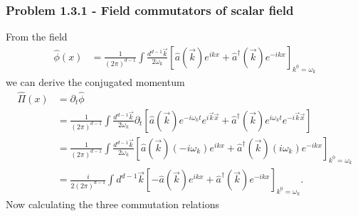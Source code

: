 \documentclass[10pt,a4paper]{book}
\theoremstyle{definition}
\begin{document}
\subsubsection{Problem 1.3.1 - Field commutators of scalar field}
From the field  
\begin{align}
    \hat\phi(x)&=\frac{1}{(2\pi)^{d-1}}\int \frac{d^{d-1}\vec{k}}{2\omega_k}\left[\hat a(\vec{k})e^{ikx} + \hat a^\dagger(\vec{k})e^{-ikx}\right]_{k^0=\omega_k}
\end{align}
we can derive the conjugated momentum
\begin{align}
    \hat\Pi(x)&=\partial_t\hat\phi\\
    &=\frac{1}{(2\pi)^{d-1}}\int \frac{d^{d-1}\vec{k}}{2\omega_k}\partial_t\left[\hat a(\vec{k})e^{-i\omega_kt}e^{i\vec{k}\vec{x}} + \hat a^\dagger(\vec{k})e^{i\omega_kt}e^{-i\vec{k}\vec{x}}\right]\\
    &=\frac{1}{(2\pi)^{d-1}}\int \frac{d^{d-1}\vec{k}}{2\omega_k}\left[\hat a(\vec{k})(-i\omega_k)e^{ikx} + \hat a^\dagger(\vec{k})(i\omega_k)e^{-ikx}\right]_{k^0=\omega_k}\\
    &=\frac{i}{2(2\pi)^{d-1}}\int d^{d-1}\vec{k}\left[-\hat a(\vec{k})e^{ikx} + \hat a^\dagger(\vec{k})e^{-ikx}\right]_{k^0=\omega_k}.
\end{align}
Now calculating the three commutation relations
\end{document}
